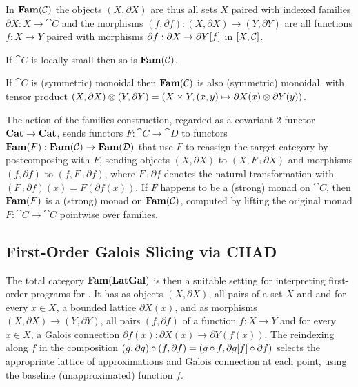 \noindent In $\mathbf{Fam}(\mathcal{C})$ the objects $(X, \partial X)$ are thus all sets $X$ paired with indexed families
$\partial X: X \to \cat{C}$ and the morphisms $(f, \partial f): (X, \partial X) \to (Y, \partial Y)$ are all
functions $f: X \to Y$ paired with morphisms $\partial f: \partial X \to \partial Y[f]$ in
$[X,\mathcal{C}]$.

\begin{proposition}
\label{prop:Grothendieck:fam-inherits-local-smallness}
If $\cat{C}$ is locally small then so is $\mathbf{Fam}(\mathcal{C})$.
\end{proposition}

\begin{proposition}
\label{prop:Grothendieck:fam-inherits-products}
If $\cat{C}$ is (symmetric) monoidal then $\mathbf{Fam}(\mathcal{C})$ is also (symmetric) monoidal, with tensor product
$(X, \partial X) \otimes (Y, \partial Y) = (X \times Y,(x, y) \mapsto \partial X(x) \otimes \partial Y(y))$.
\end{proposition}

The action of the families construction, regarded as a covariant 2-functor $\mathbf{Cat} \to \mathbf{Cat}$, sends functors $F:
\cat{C} \to \cat{D}$ to functors $\mathbf{Fam}(F): \mathbf{Fam}(\mathcal{C}) \to \mathbf{Fam}(\mathcal{D})$ that use $F$ to reassign the
target category by postcomposing with $F$, sending objects $(X, \partial X)$ to $(X, F \comp \partial X)$ and
morphisms $(f, \partial f)$ to $(f, F \comp \partial f)$, where $F \comp \partial f$ denotes the natural
transformation with $(F \comp \partial f)(x) = F(\partial f(x))$. If $F$ happens to be a (strong) monad on
$\cat{C}$, then $\mathbf{Fam}(F)$ is a (strong) monad on $\mathbf{Fam}(\mathcal{C})$, computed by lifting the original monad $F:
\cat{C} \to \cat{C}$ pointwise over families.

\subsection{First-Order Galois Slicing via CHAD}
\label{sec:fam:galois-slicing}

The total category $\mathbf{Fam}(\mathbf{LatGal})$ is then a suitable setting for interpreting first-order programs for \GPS.
It has as objects $(X, \partial X)$, all pairs of a set $X$ and and for every $x \in X$, a bounded lattice
$\partial X(x)$, and as morphisms $(X, \partial X) \to (Y, \partial Y)$, all pairs $(f, \partial f)$ of a
function $f: X \to Y$ and for every $x \in X$, a Galois connection $\partial f(x): \partial X(x) \to \partial
Y(f(x))$. The reindexing along $f$ in the composition $(g, \partial g) \circ (f, \partial f) = (g \circ f,
\partial g[f] \circ \partial f)$ selects the appropriate lattice of approximations and Galois
connection at each point, using the baseline (unapproximated) function $f$.

